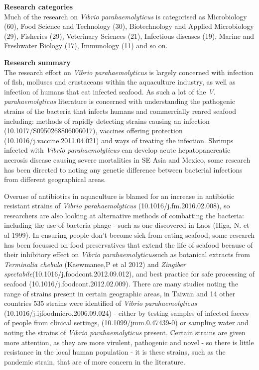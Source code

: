 \documentclass[]{book}
\theoremstyle{definition}
\theoremstyle{definition}
\theoremstyle{definition}
\theoremstyle{remark}
\begin{document}
\textbf{Research categories}\\
Much of the research on \emph{Vibrio parahaemolyticus} is categorised as
Microbiology (60), Food Science and Technology (30), Biotechnology and
Applied Microbiology (29), Fisheries (29), Veterinary Sciences (21),
Infectious diseases (19), Marine and Freshwater Biology (17), Immunology
(11) and so on.

\textbf{Research summary}\\
The research effort on \emph{Vibrio parahaemolyticus} is largely
concerned with infection of fish, molluscs and crustaceans within the
aquaculture industry, as well as infection of humans that eat infected
seafood. As such a lot of the \emph{V. parahaemolyticus} literature is
concerned with understanding the pathogenic strains of the bacteria that
infects humans and commercially reared seafood including: methods of
rapidly detecting strains causing an infection
(10.1017/S0950268806006017), vaccines offering protection
(10.1016/j.vaccine.2011.04.021) and ways of treating the infection.
Shrimps infected with \emph{Vibrio parahaemolyticus} can develop acute
hepatopancreatic necrosis disease causing severe mortalities in SE Asia
and Mexico, some research has been directed to noting any genetic
difference between bacterial infections from different geographical
areas.

Overuse of antibiotics in aquaculture is blamed for an increase in
antibiotic resistant strains of \emph{Vibrio parahaemolyticus}
(10.1016/j.fm.2016.02.008), so researchers are also looking at
alternative methods of combatting the bacteria: including the use of
bacteria phage - such as one discovered in Laos (Higa, N. et al 1999).
In ensuring people don't become sick from eating seafood, some research
has been focussed on food preservatives that extend the life of seafood
because of their inhibitory effect on \emph{Vibrio parahaemolyticus}such
as botanical extracts from \emph{Terminalia chebula} (Kaewmanee,P et al
2012) and \emph{Zingiber spectabile}(10.1016/j.foodcont.2012.09.012),
and best practice for safe processing of seafood
(10.1016/j.foodcont.2012.02.009). There are many studies noting the
range of strains present in certain geographic areas, in Taiwan and 14
other countries 535 strains were identified of \emph{Vibrio
parahaemolyticus} (10.1016/j.ijfoodmicro.2006.09.024) - either by
testing samples of infected faeces of people from clinical settings,
(10.1099/jmm.0.47439-0) or sampling water and noting the strains of
\emph{Vibrio parahaemolyticus} present. Certain strains are given more
attention, as they are more virulent, pathogenic and novel - so there is
little resistance in the local human population - it is these strains,
such as the pandemic strain, that are of more concern in the literature.
\end{document}
